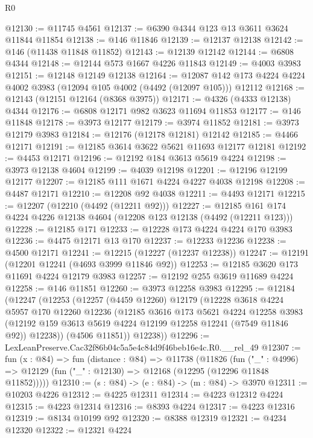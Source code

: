 \begin{lexlean}{R0}
\begin{coremodule}
@12130 := @11745 @4561
@12137 := @6390 @4344 @123 @13 @3611 @3624 @11844 @11854
@12138 := @146 @11846
@12139 := @12137 @12138
@12142 := @146 (@11438 @11848 @11852)
@12143 := @12139 @12142
@12144 := @6808 @4344
@12148 := @12144 @573 @1667 @4226 @11843
@12149 := @4003 @3983
@12151 := @12148 @12149 @12138
@12164 := @12087 @142 @173 @4224 @4224 @4002 @3983 (@12094 @105 @4002 (@4492 (@12097 @105))) @12112
@12168 := @12143 (@12151 @12164 (@8368 @3975))
@12171 := @4326 (@4333 @12138) @4344
@12176 := @6808 @12171 @982 @3623 @11694 @11853
@12177 := @146 @11848
@12178 := @3973 @12177
@12179 := @3974 @11852
@12181 := @3973 @12179 @3983
@12184 := @12176 (@12178 @12181) @12142
@12185 := @4466 @12171
@12191 := @12185 @3614 @3622 @5621 @11693 @12177 @12181
@12192 := @4453 @12171
@12196 := @12192 @184 @3613 @5619 @4224
@12198 := @3973 @12138 @4604
@12199 := @4039 @12198
@12201 := @12196 @12199 @12177
@12207 := @12185 @111 @1671 @4224 @4227 @4038 @12198
@12208 := @4487 @12171
@12210 := @12208 @92 @4038
@12211 := @4493 @12171
@12215 := @12207 (@12210 (@4492 (@12211 @92)))
@12227 := @12185 @161 @174 @4224 @4226 @12138 @4604 (@12208 @123 @12138 (@4492 (@12211 @123)))
@12228 := @12185 @171
@12233 := @12228 @173 @4224 @4224 @170 @3983
@12236 := @4475 @12171 @13 @170
@12237 := @12233 @12236
@12238 := @4500 @12171
@12241 := @12215 (@12227 (@12237 @12238))
@12247 := @12191 (@12201 @12241 (@4693 @3999 @11846 @92))
@12253 := @12185 @3620 @173 @11691 @4224 @12179 @3983
@12257 := @12192 @255 @3619 @11689 @4224
@12258 := @146 @11851
@12260 := @3973 @12258 @3983
@12295 := @12184
    (@12247
      (@12253
        (@12257
          (@4459 @12260)
          @12179
          (@12228
            @3618
            @4224
            @5957
            @170
            @12260
            @12236
            (@12185
              @3616
              @173
              @5621
              @4224
              @12258
              @3983
              (@12192 @159 @3613 @5619 @4224 @12199 @12258 @12241 (@7549 @11846 @92))
              @12238))
          (@4506 @11851))
        @12238))
@12296 := LexLeanPreserve.Cac32f86b04c5a5e4c84d9f46beb16e4c.R0.__rel_49
@12307 := fun (x : @84) =>
  fun (distance : @84) =>
  @11738
    (@11826
      (fun ("_" : @4996) => @12129 (fun ("_" : @12130) => @12168 (@12295 (@12296 @11848 @11852)))))
@12310 := (s : @84) -> (e : @84) -> (m : @84) -> @3970
@12311 := @10203 @4226
@12312 := @4225 @12311
@12314 := @4223 @12312 @4224
@12315 := @4223 @12314
@12316 := @8393 @4224
@12317 := @4223 @12316
@12319 := @8134 @10199 @92
@12320 := @8388 @12319
@12321 := @4234 @12320
@12322 := @12321 @4224

\end{coremodule}
\end{lexlean}
